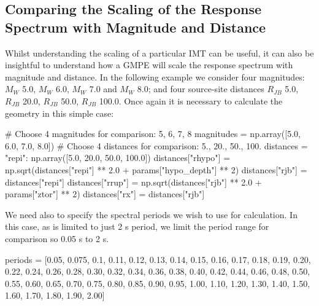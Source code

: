 \subsection{Comparing the Scaling of the Response Spectrum with Magnitude and Distance}

Whilst understanding the scaling of a particular IMT can be useful, it can also be insightful to understand how a GMPE will scale the response spectrum with magnitude and distance. In the following example we consider four magnitudes: $M_W$ 5.0, $M_W$ 6.0, $M_W$ 7.0 and $M_W$ 8.0; and four source-site distances $R_{JB}$ 5.0, $R_{JB}$ 20.0, $R_{JB}$ 50.0, $R_{JB}$ 100.0. Once again it is necessary to calculate the geometry in this simple case:
\begin{python}
# Choose 4 magnitudes for comparison: 5, 6, 7, 8
magnitudes = np.array([5.0, 6.0, 7.0, 8.0])
# Choose 4 distances for comparison: 5., 20., 50., 100.
distances = {"repi": np.array([5.0, 20.0, 50.0, 100.0])}
distances["rhypo"] = np.sqrt(distances["repi"] ** 2.0 +
                             params["hypo_depth"] ** 2)
distances["rjb"] = distances["repi"]
distances["rrup"] = np.sqrt(distances["rjb"] ** 2.0 + 
                            params["ztor"] ** 2)
distances["rx"] = distances["rjb"]
\end{python}

We need also to specify the spectral periods we wish to use for calculation. In this case, as \cite{AkkarCagnan2010} is limited to just 2 s period, we limit the period range for comparison so 0.05 s to 2 s.

\begin{python}
periods = [0.05, 0.075, 0.1, 0.11, 0.12, 0.13, 0.14, 0.15,
           0.16, 0.17, 0.18, 0.19, 0.20, 0.22, 0.24, 0.26, 
           0.28, 0.30, 0.32, 0.34, 0.36, 0.38, 0.40, 0.42, 
           0.44, 0.46, 0.48, 0.50, 0.55, 0.60, 0.65, 0.70,
           0.75, 0.80, 0.85, 0.90, 0.95, 1.00, 1.10, 1.20, 
           1.30, 1.40, 1.50, 1.60, 1.70, 1.80, 1.90, 2.00]
\end{python}

